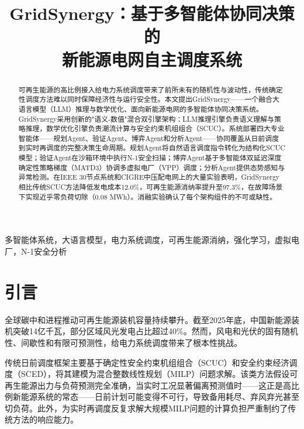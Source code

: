 \documentclass[conference]{IEEEtran}
\begin{document}
\title{GridSynergy：基于多智能体协同决策的\\新能源电网自主调度系统}

\author{
}

\maketitle

\begin{abstract}
可再生能源的高比例接入给电力系统调度带来了前所未有的随机性与波动性，传统确定性调度方法难以同时保障经济性与运行安全性。本文提出GridSynergy——一个融合大语言模型（LLM）推理与数学优化、面向新能源电网的多智能体协同决策系统。GridSynergy采用创新的"语义-数值"混合双引擎架构：LLM推理引擎负责语义理解与策略推理，数学优化引擎负责潮流计算与安全约束机组组合（SCUC）。系统部署四大专业智能体——规划Agent、验证Agent、博弈Agent和分析Agent——协同覆盖从日前调度到实时再调度的完整决策生命周期。规划Agent将自然语言调度指令转化为结构化SCUC模型；验证Agent在沙箱环境中执行N-1安全扫描；博弈Agent基于多智能体双延迟深度确定性策略梯度（MATD3）协调多虚拟电厂（VPP）调度；分析Agent提供态势感知与异常检测。在IEEE 30节点系统和CIGRE中压配电网上的大量实验表明，GridSynergy相比传统SCUC方法降低发电成本12.0\%，可再生能源消纳率提升至97.3\%，在故障场景下实现近乎零负荷切除（0.08 MWh）。消融实验确认了每个架构组件的不可或缺性。
\end{abstract}

\begin{IEEEkeywords}
多智能体系统，大语言模型，电力系统调度，可再生能源消纳，强化学习，虚拟电厂，N-1安全分析
\end{IEEEkeywords}

\section{引言}

全球碳中和进程推动可再生能源装机容量持续攀升。截至2025年底，中国新能源装机突破14亿千瓦，部分区域风光发电占比超过40\%\cite{ire2025}。然而，风电和光伏的固有随机性、间歇性和有限可预测性，给电力系统调度带来了根本性挑战。

传统日前调度框架主要基于确定性安全约束机组组合（SCUC）和安全约束经济调度（SCED），将其建模为混合整数线性规划（MILP）问题求解。该类方法假设可再生能源出力与负荷预测完全准确，当实时工况显著偏离预测值时——这正是高比例新能源系统的常态——日前计划可能变得不可行，导致备用耗尽、弃风弃光甚至切负荷。此外，为实时再调度反复求解大规模MILP问题的计算负担严重制约了传统方法的响应能力。
\end{document}
